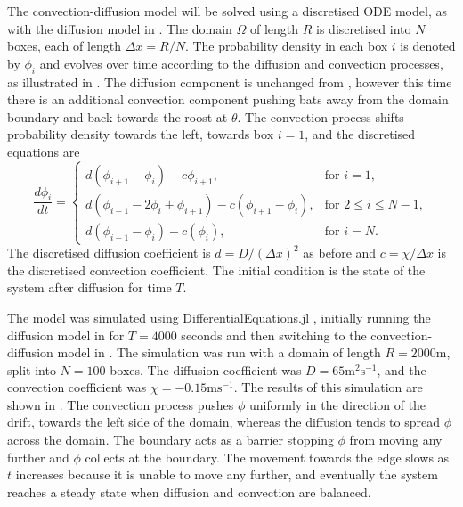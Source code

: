 The convection-diffusion model will be solved using a discretised ODE model, as with the diffusion model in . The domain $\Omega$ of length $R$ is discretised into $N$ boxes, each of length $\Delta x = R/N$. The probability density in each box $i$ is denoted by $\phi_i$ and evolves over time according to the diffusion and convection processes, as illustrated in . The diffusion component is unchanged from , however this time there is an additional convection component pushing bats away from the domain boundary and back towards the roost at $\theta$. The convection process shifts probability density towards the left, towards box $i = 1$, and the discretised equations are
%
\begin{equation}
\frac{d\phi_i}{dt} = \begin{cases}
		d(\phi_{i+1} - \phi_i) - c \phi_{i+1}, & \text{for } i = 1, \\
		d(\phi_{i-1}-2\phi_i +\phi_{i+1}) - c(\phi_{i+1}-\phi_{i}), & \text{for } 2 \leq i \leq N-1, \\
		d(\phi_{i-1}-\phi_i) - c(\phi_{i}), & \text{for } i = N.
		\end{cases}
        \label{eqn:discrete_convection}
\end{equation}
%
The discretised diffusion coefficient is $d = D/(\Delta x)^2$ as before and $c=\chi/\Delta x$ is the discretised convection coefficient. The initial condition is the state of the system after diffusion for time $T$.

The model was simulated using DifferentialEquations.jl \cite{DifferentialEquations}, initially running the
diffusion model in  for $T = 4000$ seconds and
then switching to the convection-diffusion model in . The
simulation was run with a domain of length $R = 2000$m, split into $N = 100$
boxes. The diffusion coefficient was $D = 65\mathrm{m^2s^{-1}}$, and the convection coefficient
was $\chi =  - 0.15\mathrm{ms^{-1}}$. The results
of this simulation are shown in . The convection process pushes $\phi$ uniformly in the direction of the drift, towards the left side of the domain, whereas the diffusion tends to spread $\phi$ across the domain. The boundary acts as a barrier stopping $\phi$ from moving any further and $\phi$ collects at the boundary. The movement towards the edge slows as $t$ increases because it is unable to move any further, and eventually the system reaches a steady state when diffusion and convection are balanced.

